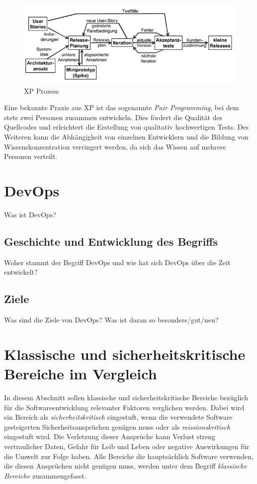 \begin{figure}
  \centering
  \includegraphics[width=\textwidth]{img/xpmodell.png}
  \caption{XP Prozess \parencite[][]{Schatten:2010aa}}
  \label{fig:xpmodell}
\end{figure}

Eine bekannte Praxis aus XP ist das sogenannte \emph{Pair Programming}, bei dem stets zwei Personen zusammen entwickeln.
Dies fördert die Qualität des Quellcodes und erleichtert die Erstellung von qualitativ hochwertigen Tests.
Des Weiteren kann die Abhängigkeit von einzelnen Entwicklern und die Bildung von Wissenskonzentration verringert werden, da sich das Wissen auf mehrere Personen verteilt.

\section{DevOps} %
Was ist DevOps?

\subsection{Geschichte und Entwicklung des Begriffs}
Woher stammt der Begriff DevOps und wie hat sich DevOps über die Zeit entwickelt?

\subsection{Ziele}
Was sind die Ziele von DevOps? Was ist daran so besonders/gut/neu?

\section{Klassische und sicherheitskritische Bereiche im Vergleich} %

In diesem Abschnitt sollen klassische und sicherheitskritische Bereiche bezüglich für die Softwareentwicklung relevanter Faktoren verglichen werden.
Dabei wird ein Bereich als \emph{sicherheitskritisch} eingestuft, wenn die verwendete Software gesteigerten Sicherheitsansprüchen genügen muss oder als \emph{missionskritisch} eingestuft wird.
Die Verletzung dieser Ansprüche kann Verlust streng vertraulicher Daten, Gefahr für Leib und Leben oder negative Auswirkungen für die Umwelt zur Folge haben.
Alle Bereiche die hauptsächlich Software verwenden, die diesen Ansprüchen nicht genügen muss, werden unter dem Begriff \emph{klassische Bereiche} zusammengefasst.

